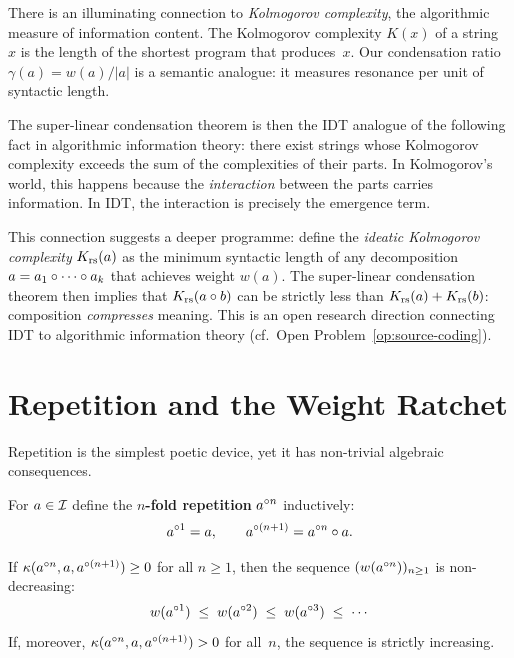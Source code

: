 \begin{interpretation}
There is an illuminating connection to \emph{Kolmogorov complexity},
the algorithmic measure of information content.  The Kolmogorov
complexity $K(x)$ of a string~$x$ is the length of the shortest
program that produces~$x$.  Our condensation ratio $\gamma(a) = w(a)/|a|$
is a semantic analogue: it measures resonance per unit of syntactic
length.

The super-linear condensation theorem is then the IDT analogue of the
following fact in algorithmic information theory: there exist strings
whose Kolmogorov complexity exceeds the sum of the complexities of their
parts.  In Kolmogorov's world, this happens because the \emph{interaction}
between the parts carries information.  In IDT, the interaction is
precisely the emergence term.

This connection suggests a deeper programme: define the \emph{ideatic
Kolmogorov complexity} $K_{\mathrm{rs}}(a)$ as the minimum syntactic length of
any decomposition $a = a_1 \circ \cdots \circ a_k$ that achieves
weight $w(a)$.  The super-linear condensation theorem then implies that
$K_{\mathrm{rs}}(a \circ b)$ can be strictly less than $K_{\mathrm{rs}}(a) + K_{\mathrm{rs}}(b)$:
composition \emph{compresses} meaning.  This is an open research
direction connecting IDT to algorithmic information theory
(cf.~Open Problem~\ref{op:source-coding}).
\end{interpretation}

\section{Repetition and the Weight Ratchet}
\label{sec:repetition}

Repetition is the simplest poetic device, yet it has non-trivial
algebraic consequences.

\begin{definition}
\label{def:iterated-composition}
For $a \in \mathcal{I}$ define the \textbf{$n$-fold repetition}
$a^{\circ n}$ inductively:
\[
  a^{\circ 1} = a,
  \qquad
  a^{\circ (n+1)} = a^{\circ n} \circ a.
\]
\end{definition}

\begin{theorem}
\label{thm:poetic-weight-ratchet}
If $\kappa(a^{\circ n}, a, a^{\circ(n+1)}) \ge 0$ for all
$n \ge 1$, then the sequence $(w(a^{\circ n}))_{n \ge 1}$ is
non-decreasing:
\[
  w(a^{\circ 1})
  \;\le\; w(a^{\circ 2})
  \;\le\; w(a^{\circ 3})
  \;\le\; \cdots
\]
If, moreover, $\kappa(a^{\circ n}, a, a^{\circ(n+1)}) > 0$
for all~$n$, the sequence is strictly increasing.
\end{theorem}

